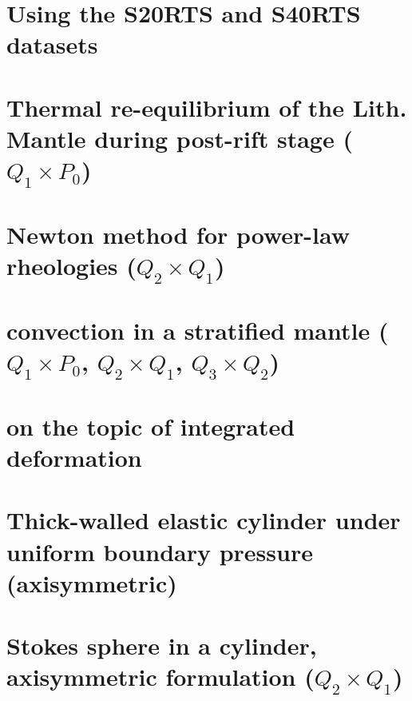 \documentclass[a4paper,11pt]{report}
\begin{document}
\chapter{Using the S20RTS and S40RTS datasets \label{f85}} %

\chapter{Thermal re-equilibrium of the Lith. Mantle during post-rift stage ($Q_1\times P_0$)\label{f86}} %

\chapter{Newton method for power-law rheologies ($Q_2\times Q_1$) \label{f87}} %

\chapter{convection in a stratified mantle ($Q_1 \times P_0$, $Q_2\times Q_1$, $Q_3\times Q_2$) \label{f88}}%

\chapter{on the topic of integrated deformation	\label{f89}} %

\chapter{Thick-walled elastic cylinder under uniform boundary pressure (axisymmetric) \label{f90}} %

\chapter{Stokes sphere in a cylinder, axisymmetric formulation ($Q_2\times Q_1$) \label{f91}} %
\end{document}
